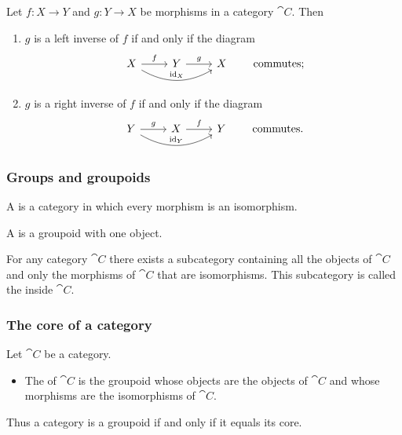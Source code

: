 \begin{lemma}
Let $f:X\to Y$ and $g:Y\to X$ be morphisms in a category $\cat{C}$. Then
\begin{enumerate}
\item $g$ is a left inverse of $f$ if and only if the diagram
\[ \begin{tikzcd}
X \rar{f} \ar[rr, bend right, "\id_X"] & Y \rar{g} & X
\end{tikzcd} \qquad \text{commutes;} \]
\item $g$ is a right inverse of $f$ if and only if the diagram
\[ \begin{tikzcd}
Y \rar{g} \ar[rr, bend right, "\id_Y"] & X \rar{f} & Y
\end{tikzcd} \qquad \text{commutes.} \]
\end{enumerate}
\end{lemma}


\subsubsection{Groups and groupoids}
\begin{definition}
A  is a category in which every morphism is an isomorphism.

A  is a groupoid with one object.
\end{definition}

\begin{lemma}
For any category $\cat{C}$ there exists a subcategory containing all the objects of $\cat{C}$ and only the morphisms of $\cat{C}$ that are isomorphisms. This subcategory is called the  inside $\cat{C}$.
\end{lemma}

\subsubsection{The core of a category}
\begin{definition}
Let $\cat{C}$ be a category.
\begin{itemize}
\item The  of $\cat{C}$ is the groupoid whose objects are the objects of $\cat{C}$ and whose morphisms are the isomorphisms of $\cat{C}$.
\end{itemize}
\end{definition}

Thus a category is a groupoid if and only if it equals its core.

